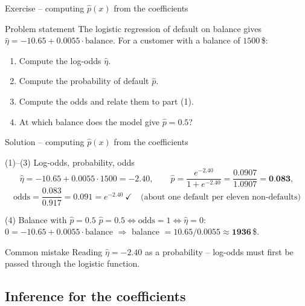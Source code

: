 \documentclass[aspectratio=169,11pt]{beamer}
\begin{document}
\begin{frame}{Exercise -- computing $\hat p(x)$ from the coefficients}
  \begin{block}{Problem statement}
    The logistic regression of default on balance gives
    $\hat\eta=-10.65+0.0055\cdot\text{balance}$. For a customer with a
    balance of $1500$\,\$:
    \begin{enumerate}
      \item Compute the log-odds $\hat\eta$.
      \item Compute the probability of default $\hat p$.
      \item Compute the odds and relate them to part (1).
      \item At which balance does the model give $\hat p=0.5$?
    \end{enumerate}
  \end{block}
\end{frame}

\begin{frame}{Solution -- computing $\hat p(x)$ from the coefficients}
  \begin{exampleblock}{(1)--(3) Log-odds, probability, odds}
    \[
      \hat\eta = -10.65+0.0055\cdot1500=-2.40,\qquad
      \hat p = \frac{e^{-2.40}}{1+e^{-2.40}}=\frac{0.0907}{1.0907}=\textbf{0.083},
    \]
    \[
      \text{odds} = \frac{0.083}{0.917}=0.091=e^{-2.40}\ \checkmark
      \quad\text{(about one default per eleven non-defaults)}
    \]
  \end{exampleblock}
  \begin{exampleblock}{(4) Balance with $\hat p=0.5$}
    $\hat p=0.5\Leftrightarrow\text{odds}=1\Leftrightarrow\hat\eta=0$:\\
    $0=-10.65+0.0055\cdot\text{balance}$ $\Rightarrow$
    balance $=10.65/0.0055\approx\textbf{1936}$\,\$.
  \end{exampleblock}
  \begin{alertblock}{Common mistake}
    Reading $\hat\eta=-2.40$ as a probability -- log-odds must first be
    passed through the logistic function.
  \end{alertblock}
\end{frame}

\subsection{Inference for the coefficients}
\end{document}

